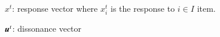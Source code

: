 \documentclass[onecolumn, compsoc,11pt]{IEEEtran}
\makeatletter
\renewcommand\section{\@startsection {section}{1}{\z@}%
                                   {-1ex \@plus -1ex \@minus -.2ex}%
                                   {0.05ex \@plus.1ex}%
                                   {\large\bfseries\scshape}}
\makeatother
\begin{document}
 




















\clearpage


$x^t$: response vector where $x^t_i$ is the response to $i\in I$ item.

$\boldsymbol{u}^t$: dissonance vector
\end{document}
